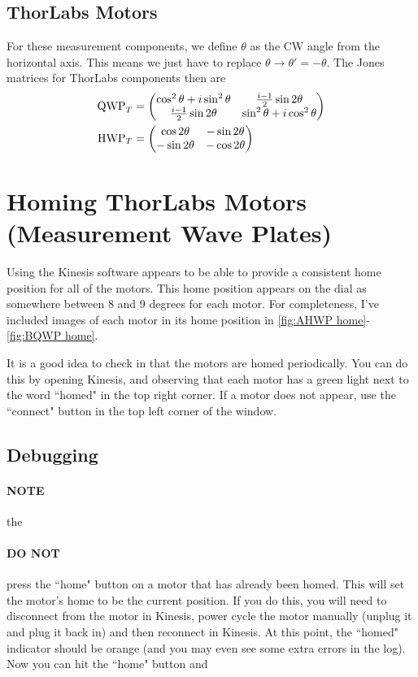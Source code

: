 \documentclass{paper}[11pt]
\begin{document}
	\subsection{ThorLabs Motors}
	For these measurement components, we define $\theta$ as the CW angle from the horizontal axis. This means we just have to replace $\theta\rightarrow\theta'=-\theta$. The Jones matrices for ThorLabs components then are
	\begin{align}
		\text{\rmfamily QWP\normalfont}_T &= \begin{pmatrix}
			\cos^2\theta + i\sin^2\theta & \frac{i-1}{2}\sin2\theta \\
			\frac{i-1}{2}\sin2\theta & \sin^2\theta + i\cos^2\theta
		\end{pmatrix} \\
		\text{\rmfamily HWP\normalfont}_T &= \begin{pmatrix}
			\cos2\theta & -\sin2\theta \\ -\sin2\theta & -\cos2\theta
		\end{pmatrix}
	\end{align}
		
	\section{Homing ThorLabs Motors (Measurement Wave Plates)}
	Using the Kinesis software appears to be able to provide a consistent home position for all of the motors. This home position appears on the dial as somewhere between 8 and 9 degrees for each motor. For completeness, I've included images of each motor in its home position in \cref{fig:AHWP home}-\ref{fig:BQWP home}.
	
	It is a good idea to check in that the motors are homed periodically. You can do this by opening Kinesis, and observing that each motor has a green light next to the word ``homed" in the top right corner. If a motor does not appear, use the ``connect" button in the top left corner of the window.
	
	\subsection{Debugging}
	
	\paragraph{NOTE} the 
	
	\paragraph{DO NOT} press the ``home" button on a motor that has already been homed. This will set the motor's home to be the current position. If you do this, you will need to disconnect from the motor in Kinesis, power cycle the motor manually (unplug it and plug it back in) and then reconnect in Kinesis. At this point, the ``homed" indicator should be orange (and you may even see some extra errors in the log). Now you can hit the ``home" button and 
	
\end{document}
